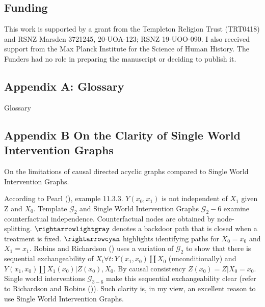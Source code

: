 \documentclass[
  single column]{article}
\begin{document}
\subsection{Funding}\label{funding}

This work is supported by a grant from the Templeton Religion Trust
(TRT0418) and RSNZ Marsden 3721245, 20-UOA-123; RSNZ 19-UOO-090. I also
received support from the Max Planck Institute for the Science of Human
History. The Funders had no role in preparing the manuscript or deciding
to publish it.

\newpage{}

\subsection{Appendix A: Glossary}\label{id-app-a}

\begin{table}

\caption{\label{tbl-gloassary}Glossary}

\centering{

\glossaryTerms

}

\end{table}%

\newpage{}

\subsection{Appendix B On the Clarity of Single World Intervention
Graphs}\label{id-app-b}

\begin{table}

\caption{\label{tbl-pearltable}On the limitations of causal directed
acyclic graphs compared to Single World Intervention Graphs.}

\centering{

\pearltable

}

\end{table}%

According to Pearl (), example 11.3.3.
\(Y(x_0, x_1)\) is not independent of \(X_1\) given Z and \(X_0\).
Template \(\mathcal{G}_2\) and Single World Intervention Graphs
\(\mathcal{G}_2-6\) examine counterfactual independence. Counterfactual
nodes are obtained by node-splitting. \(\rightarrowlightgray\) denotes a
backdoor path that is closed when a treatment is fixed.
\(\rightarrowcyan\) highlights identifying paths for \(X_0 = x_0\) and
\(X_1 = x_1\). Robins and Richardson
() uses a variation of
\(\mathcal{G}_2\) to show that there is sequential exchangeability of
\(X_t \forall t: Y(x_1, x_0)\coprod X_0\) (unconditionally) and
\(Y(x_1, x_0)\coprod X_1(x_0) | Z(x_0), X_0\). By causal consistency
\(Z(x_0) = Z|X_0 = x_0\). Single world interventions
\(\mathcal{G}_{3-6}\) make this sequential exchangeability clear (refer
to Richardson and Robins ()). Such
clarity is, in my view, an excellent reason to use Single World
Intervention Graphs.
\end{document}
